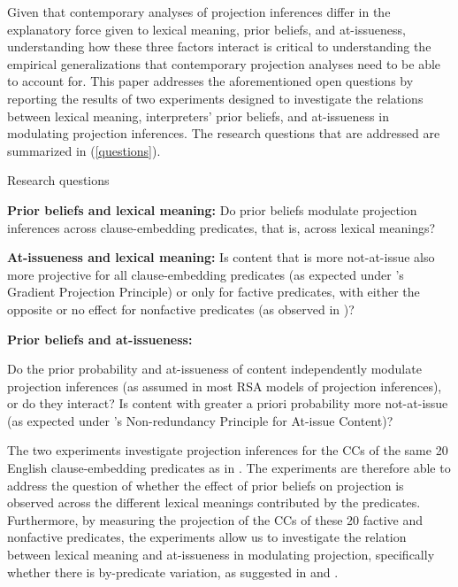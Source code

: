 \documentclass[11pt,fleqn]{article}
\newcommand{\6}{\mbox{$[\hspace*{-.6mm}[$}}
\newcommand{\9}{\mbox{$]\hspace*{-.6mm}]$}}
\newcommand{\citepos}[1]{\citeauthor{#1}'s \citeyear{#1}}
\begin{document}
Given that contemporary analyses of projection inferences differ in the explanatory force given to lexical meaning, prior beliefs, and at-issueness, understanding how these three factors interact is critical to understanding the empirical generalizations that contemporary projection analyses need to be able to account for. This paper addresses the aforementioned open questions by reporting the results of two experiments designed to investigate the relations between lexical meaning, interpreters' prior beliefs, and at-issueness in modulating projection inferences. The research questions that are addressed are summarized in (\ref{questions}). 

\begin{exe}
\ex\label{questions} Research questions
\begin{xlist}
 {\bf Prior beliefs and lexical meaning:} Do prior beliefs modulate  projection inferences across clause-embedding predicates, that is, across lexical meanings? 

 {\bf At-issueness and lexical meaning:} Is content that is more not-at-issue also more projective for all clause-embedding predicates (as expected under \citepos{tbd-variability} Gradient Projection Principle) or only for factive predicates, with either the opposite or no effect for nonfactive predicates (as observed in \citealt{djaerv-bacovcin-salt27,djaerv-bacovcin2020,mahler-etal2020})?

 {\bf Prior beliefs and at-issueness:} 
\begin{xlist}
 Do the prior probability and at-issueness of content independently modulate projection inferences  (as assumed in most RSA models of projection inferences), or do they interact? 
 Is content with greater a priori probability more not-at-issue (as expected under \citepos{tonhauser-etal-eval} Non-redundancy Principle for At-issue Content)? 
\end{xlist}
\end{xlist}
\end{exe}

The two experiments investigate projection inferences for the CCs of the same 20 English clause-embedding predicates as in \cite{degen-tonhauser-openmind,degen-tonhauser-language}. The experiments are therefore able to address the question of whether the effect of prior beliefs on projection is observed across the different lexical meanings contributed by the predicates. Furthermore, by measuring the projection of the CCs of these 20  factive and nonfactive predicates, the experiments allow us to investigate the relation between lexical meaning and at-issueness in modulating projection, specifically whether there is by-predicate variation, as suggested in \citet{djaerv-bacovcin-salt27,djaerv-bacovcin2020} and \citet{mahler-etal2020}. 
\end{document}
